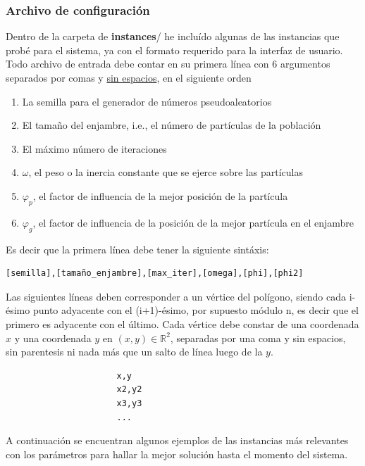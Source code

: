 \documentclass[12pt]{article}
\begin{document}
\subsubsection*{Archivo de configuración}
Dentro de la carpeta de \textbf{instances}/ he incluído algunas de las instancias que probé para el sistema, ya con el formato requerido para la interfaz de usuario. Todo archivo de entrada debe contar
en su primera línea con 6 argumentos separados por comas y \underline{sin espacios}, en el siguiente orden
\begin{enumerate}
\item La semilla para el generador de números pseudoaleatorios
\item El tamaño del enjambre, i.e., el número de partículas de la población
\item El máximo número de iteraciones
\item $\omega$, el peso o la inercia constante que se ejerce sobre las partículas
\item $\varphi_p$, el factor de influencia de la mejor posición de la partícula
\item $\varphi_g$, el factor de influencia de la posición de la mejor partícula en el enjambre
\end{enumerate}
Es decir que la primera línea debe tener la siguiente sintáxis:
\begin{verbatim}
[semilla],[tamaño_enjambre],[max_iter],[omega],[phi],[phi2]
\end{verbatim}

Las siguientes líneas deben corresponder a un vértice del polígono, siendo cada i-ésimo punto adyacente con
el (i+1)-ésimo, por supuesto módulo n, es decir que el primero es adyacente con el último.
Cada vértice debe constar de una coordenada $x$ y una coordenada $y$ en $(x,y) \in \mathbb{R}^2$,
separadas por una coma y sin espacios, sin parentesis ni nada más que un salto de línea luego de la $y$. 

\begin{verbatim}
                      x,y
                      x2,y2
                      x3,y3
                      ...
\end{verbatim}


A continuación se encuentran algunos ejemplos de las instancias más relevantes con los parámetros
para hallar la mejor solución hasta el momento del sistema.
\end{document}
